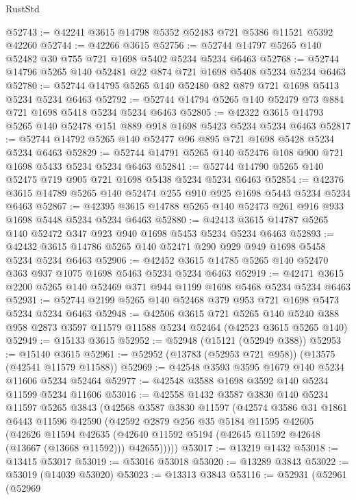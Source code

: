 \begin{lexlean}{RustStd}
\begin{coremodule}
@52743 := @42241 @3615 @14798 @5352 @52483 @721 @5386 @11521 @5392 @42260
@52744 := @42266 @3615
@52756 := @52744 @14797 @5265 @140 @52482 @30 @755 @721 @1698 @5402 @5234 @5234 @6463
@52768 := @52744 @14796 @5265 @140 @52481 @22 @874 @721 @1698 @5408 @5234 @5234 @6463
@52780 := @52744 @14795 @5265 @140 @52480 @82 @879 @721 @1698 @5413 @5234 @5234 @6463
@52792 := @52744 @14794 @5265 @140 @52479 @73 @884 @721 @1698 @5418 @5234 @5234 @6463
@52805 := @42322 @3615 @14793 @5265 @140 @52478 @151 @889 @918 @1698 @5423 @5234 @5234 @6463
@52817 := @52744 @14792 @5265 @140 @52477 @96 @895 @721 @1698 @5428 @5234 @5234 @6463
@52829 := @52744 @14791 @5265 @140 @52476 @108 @900 @721 @1698 @5433 @5234 @5234 @6463
@52841 := @52744 @14790 @5265 @140 @52475 @719 @905 @721 @1698 @5438 @5234 @5234 @6463
@52854 := @42376 @3615 @14789 @5265 @140 @52474 @255 @910 @925 @1698 @5443 @5234 @5234 @6463
@52867 := @42395 @3615 @14788 @5265 @140 @52473 @261 @916 @933 @1698 @5448 @5234 @5234 @6463
@52880 := @42413 @3615 @14787 @5265 @140 @52472 @347 @923 @940 @1698 @5453 @5234 @5234 @6463
@52893 := @42432 @3615 @14786 @5265 @140 @52471 @290 @929 @949 @1698 @5458 @5234 @5234 @6463
@52906 := @42452 @3615 @14785 @5265 @140 @52470 @363 @937 @1075 @1698 @5463 @5234 @5234 @6463
@52919 := @42471 @3615 @2200 @5265 @140 @52469 @371 @944 @1199 @1698 @5468 @5234 @5234 @6463
@52931 := @52744 @2199 @5265 @140 @52468 @379 @953 @721 @1698 @5473 @5234 @5234 @6463
@52948 := @42506
    @3615
    @721
    @5265
    @140
    @5240
    @388
    @958
    @2873
    @3597
    @11579
    @11588
    @5234
    @52464
    (@42523 @3615 @5265 @140)
@52949 := @15133 @3615
@52952 := @52948 (@15121 (@52949 @388))
@52953 := @15140 @3615
@52961 := @52952 (@13783 (@52953 @721 @958)) (@13575 (@42541 @11579 @11588))
@52969 := @42548 @3593 @3595 @1679 @140 @5234 @11606 @5234 @52464
@52977 := @42548 @3588 @1698 @3592 @140 @5234 @11599 @5234 @11606
@53016 := @42558
    @1432
    @3587
    @3830
    @140
    @5234
    @11597
    @5265
    @3843
    (@42568
      @3587
      @3830
      @11597
      (@42574
        @3586
        @31
        @1861
        @6443
        @11596
        @42590
        (@42592
          @2879
          @256
          @35
          @5184
          @11595
          @42605
          (@42626
            @11594
            @42635
            (@42640 @11592 @5194 (@42645 @11592 @42648 (@13667 (@13668 @11592))) @42655)))))
@53017 := @13219 @1432
@53018 := @13415 @53017
@53019 := @53016 @53018
@53020 := @13289 @3843
@53022 := @53019 (@14039 @53020)
@53023 := @13313 @3843
@53116 := @52931
    (@52961
      (@52969

\end{coremodule}
\end{lexlean}
